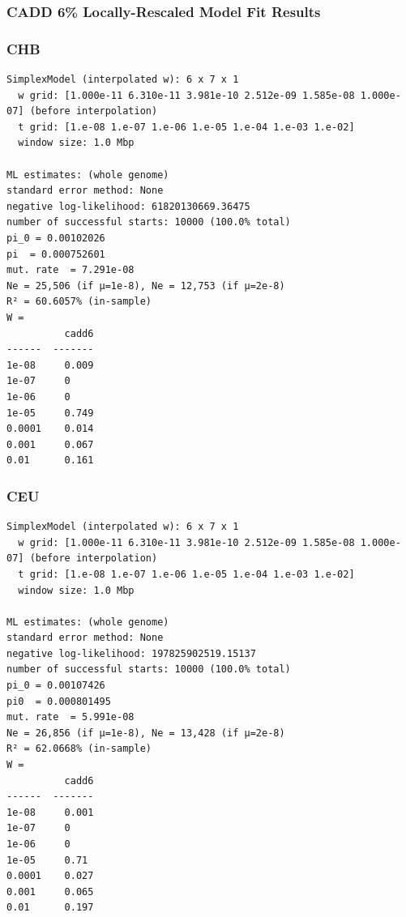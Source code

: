 \documentclass[11pt]{article}
\begin{document}
\subsubsection{CADD 6\% Locally-Rescaled Model Fit Results}

\subsubsection*{CHB}

\begin{minipage}{\linewidth}\begin{footnotesize}
\begin{verbatim}
SimplexModel (interpolated w): 6 x 7 x 1
  w grid: [1.000e-11 6.310e-11 3.981e-10 2.512e-09 1.585e-08 1.000e-07] (before interpolation)
  t grid: [1.e-08 1.e-07 1.e-06 1.e-05 1.e-04 1.e-03 1.e-02]
  window size: 1.0 Mbp

ML estimates: (whole genome)
standard error method: None
negative log-likelihood: 61820130669.36475
number of successful starts: 10000 (100.0% total)
pi_0 = 0.00102026
pi  = 0.000752601
mut. rate  = 7.291e-08
Ne = 25,506 (if μ=1e-8), Ne = 12,753 (if μ=2e-8)
R² = 60.6057% (in-sample)
W =
          cadd6
------  -------
1e-08     0.009
1e-07     0
1e-06     0
1e-05     0.749
0.0001    0.014
0.001     0.067
0.01      0.161
\end{verbatim}
\end{footnotesize}\end{minipage}


\subsubsection*{CEU}

\begin{minipage}{\linewidth}\begin{footnotesize}
\begin{verbatim}
SimplexModel (interpolated w): 6 x 7 x 1
  w grid: [1.000e-11 6.310e-11 3.981e-10 2.512e-09 1.585e-08 1.000e-07] (before interpolation)
  t grid: [1.e-08 1.e-07 1.e-06 1.e-05 1.e-04 1.e-03 1.e-02]
  window size: 1.0 Mbp

ML estimates: (whole genome)
standard error method: None
negative log-likelihood: 197825902519.15137
number of successful starts: 10000 (100.0% total)
pi_0 = 0.00107426
pi0  = 0.000801495
mut. rate  = 5.991e-08
Ne = 26,856 (if μ=1e-8), Ne = 13,428 (if μ=2e-8)
R² = 62.0668% (in-sample)
W =
          cadd6
------  -------
1e-08     0.001
1e-07     0
1e-06     0
1e-05     0.71
0.0001    0.027
0.001     0.065
0.01      0.197
\end{verbatim}
\end{footnotesize}\end{minipage}
\end{document}
